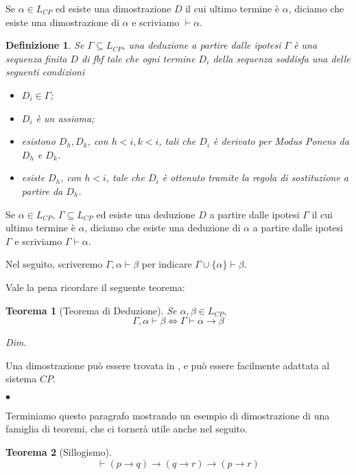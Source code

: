 \documentclass[a4paper, titlepage, 12pt]{report}
\newtheorem{theorem}{Teorema}[chapter]
\newtheorem{definition}{Definizione}[chapter]
\newenvironment{proof}
    {\textit{Dim.}
    }
    {\begin{flushright}$\bullet$\end{flushright}
    }
\begin{document}
Se $\alpha \in L_{CP}$ ed esiste una dimostrazione $D$ il cui ultimo termine è $\alpha$,
diciamo che esiste una dimostrazione di $\alpha$ e scriviamo $\vdash \alpha$.


\begin{definition}
Se $\Gamma \subseteq L_{CP}$, una deduzione a partire dalle ipotesi $\Gamma$ è una sequenza finita $D$
di fbf tale che ogni termine $D_i$ della sequenza soddisfa una delle seguenti condizioni
\begin{itemize}
\item $D_i \in \Gamma$;
\item $D_i$ è un assioma;
\item esistono $D_h, D_k$, con $h < i, k < i$, tali che $D_i$ è derivato per \emph{Modus Ponens}
da $D_h$ e $D_k$.
\item esiste $D_h$, con $h < i$, tale che $D_i$ è ottenuto tramite
la regola di \emph{sostituzione} a partire da $D_h$.
\end{itemize}
\end{definition}

Se $\alpha \in L_{CP}$, $\Gamma \subseteq L_{CP}$ ed esiste una deduzione $D$ a partire dalle ipotesi $\Gamma$
il cui ultimo termine è $\alpha$, diciamo che esiste una deduzione di $\alpha$
a partire dalle ipotesi $\Gamma$ e scriviamo $\Gamma \vdash \alpha$.

Nel seguito, scriveremo $\Gamma, \alpha \vdash \beta$
per indicare $\Gamma \cup \{\alpha\} \vdash \beta$.

Vale la pena ricordare il seguente teorema:
\begin{theorem}[Teorema di Deduzione]
Se $\alpha, \beta \in L_{CP},$
$$\Gamma, \alpha \vdash \beta \Leftrightarrow \Gamma \vdash \alpha \rightarrow \beta$$
\end{theorem}
\begin{proof}
Una dimostrazione può essere trovata in \cite{Mendelson}, e può essere facilmente
adattata al sistema $CP$.
\end{proof}

Terminiamo questo paragrafo mostrando un esempio di dimostrazione di una famiglia
di teoremi, che ci tornerà utile anche nel seguito.

\begin{theorem}[Sillogismo] \label{sillogismo}
$$\vdash (p \rightarrow q) \rightarrow
        (q \rightarrow r) \rightarrow (p \rightarrow r)$$
\end{theorem}
\end{document}
